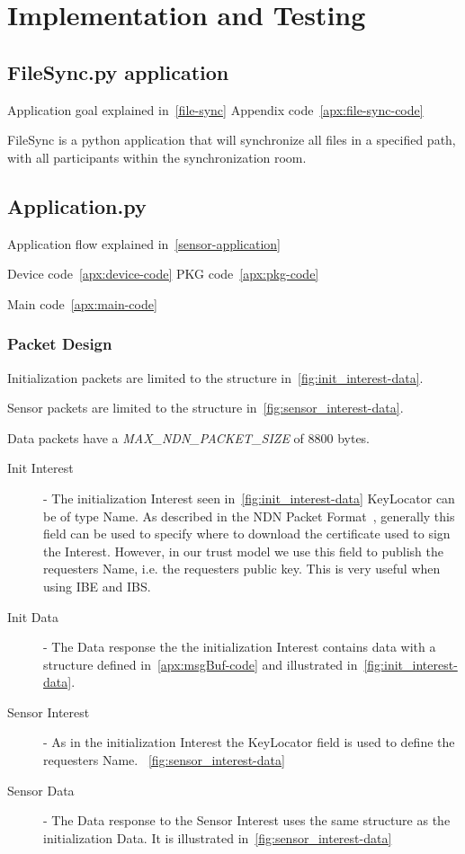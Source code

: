 \chapter{Implementation and Testing}

\section{FileSync.py application}
Application goal explained in~\autoref{file-sync}
Appendix code~\autoref{apx:file-sync-code}

FileSync is a python application that will synchronize all files in a specified path, with all participants within the synchronization room.

\section{Application.py}
Application flow explained in~\autoref{sensor-application}

Device code~\autoref{apx:device-code}
\gls{PKG} code~\autoref{apx:pkg-code}

Main code~\autoref{apx:main-code}

\subsection{Packet Design}
Initialization packets are limited to the structure in~\autoref{fig:init_interest-data}.

Sensor packets are limited to the structure in~\autoref{fig:sensor_interest-data}.

Data packets have a \textit{MAX_NDN_PACKET_SIZE} of 8800 bytes.
\begin{description}
	\item[Init Interest] - 
  The initialization Interest seen in~\autoref{fig:init_interest-data}
  KeyLocator can be of type Name. 
  As described in the \gls{NDN} Packet Format~\cite{ndnpacketformat}, generally this field can be used to specify where to download the certificate used to sign the Interest.
  However, in our trust model we use this field to publish the requesters Name, i.e. the requesters public key. 
  This is very useful when using \gls{IBE} and \gls{IBS}.
	\item[Init Data] - 
  The Data response the the initialization Interest contains data with a structure defined in~\autoref{apx:msgBuf-code} and illustrated in~\autoref{fig:init_interest-data}.
	\item[Sensor Interest] -
	As in the initialization Interest the KeyLocator field is used to define the requesters Name. ~\autoref{fig:sensor_interest-data}
	\item[Sensor Data] - 
  The Data response to the Sensor Interest uses the same structure as the initialization Data. It is illustrated in~\autoref{fig:sensor_interest-data}
\end{description}


